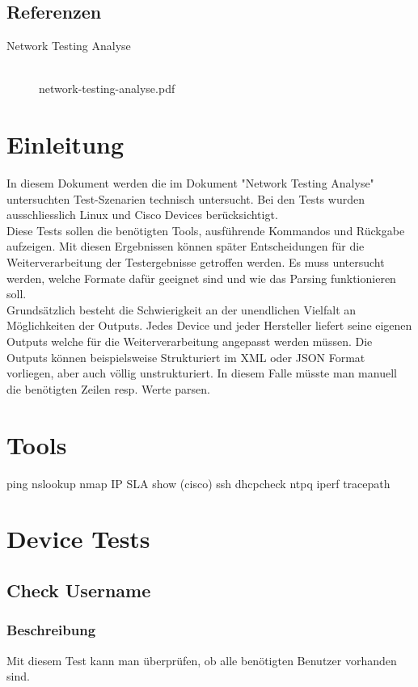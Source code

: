 \documentclass[a4,12pt]{scrartcl}
\begin{document}
\subsection{Referenzen}
\begin{description}
  \item[Network Testing Analyse] \hfill \\
  network-testing-analyse.pdf \\
\end{description}
\newpage
\section{Einleitung}
In diesem Dokument werden die im Dokument "Network Testing Analyse" untersuchten Test-Szenarien technisch untersucht. Bei den Tests wurden ausschliesslich Linux und Cisco Devices berücksichtigt.\\

\noindent Diese Tests sollen die benötigten Tools, ausführende Kommandos und Rückgabe aufzeigen. Mit diesen Ergebnissen können später Entscheidungen für die Weiterverarbeitung der Testergebnisse getroffen werden. Es muss untersucht werden, welche Formate dafür geeignet sind und wie das Parsing funktionieren soll.\\

\noindent Grundsätzlich besteht die Schwierigkeit an der unendlichen Vielfalt an Möglichkeiten der Outputs. Jedes Device und jeder Hersteller liefert seine eigenen Outputs welche für die Weiterverarbeitung angepasst werden müssen. Die Outputs können beispielsweise Strukturiert im XML oder JSON Format vorliegen, aber auch völlig unstrukturiert. In diesem Falle müsste man manuell die benötigten Zeilen resp. Werte parsen.

\newpage
\section{Tools}

ping
nslookup
nmap
IP SLA
show (cisco)
ssh
dhcpcheck
ntpq
iperf
tracepath
\newpage
\section{Device Tests}

\subsection{Check Username}
\subsubsection{Beschreibung}
Mit diesem Test kann man überprüfen, ob alle benötigten Benutzer vorhanden sind.
\end{document}
